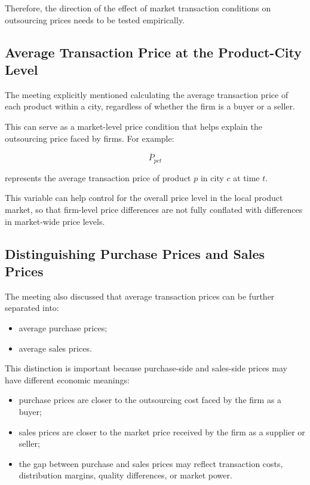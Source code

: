 \documentclass[11pt,a4paper]{article}
\begin{document}
Therefore, the direction of the effect of market transaction conditions on outsourcing prices needs to be tested empirically.

\subsection{Average Transaction Price at the Product-City Level}

The meeting explicitly mentioned calculating the average transaction price of each product within a city, regardless of whether the firm is a buyer or a seller.

This can serve as a market-level price condition that helps explain the outsourcing price faced by firms. For example:

\[
\overline{P}_{p c t}
\]

represents the average transaction price of product \(p\) in city \(c\) at time \(t\).

This variable can help control for the overall price level in the local product market, so that firm-level price differences are not fully conflated with differences in market-wide price levels.

\subsection{Distinguishing Purchase Prices and Sales Prices}

The meeting also discussed that average transaction prices can be further separated into:

\begin{itemize}
    \item average purchase prices;
    \item average sales prices.
\end{itemize}

This distinction is important because purchase-side and sales-side prices may have different economic meanings:

\begin{itemize}
    \item purchase prices are closer to the outsourcing cost faced by the firm as a buyer;
    \item sales prices are closer to the market price received by the firm as a supplier or seller;
    \item the gap between purchase and sales prices may reflect transaction costs, distribution margins, quality differences, or market power.
\end{itemize}
\end{document}
